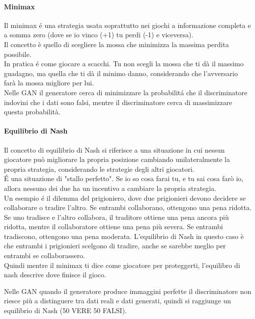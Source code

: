 \paragraph{Minimax}
Il minimax é una strategia usata soprattutto nei giochi a informazione completa e a somma zero (dove se io vinco (+1) tu perdi (-1) e viceversa).\\
Il concetto è quello di scegliere la mossa che minimizza la massima perdita possibile.\\
In pratica é come giocare a scacchi. Tu non scegli la mossa che ti dà il massimo guadagno, ma quella che ti dà il minimo danno, considerando che l'avversario farà la mossa migliore per lui.\\
Nelle GAN il generatore cerca di minimizzare la probabilitá che il discriminatore indovini che i dati sono falsi, mentre il discriminatore cerca di massimizzare questa probabilità.\\

\paragraph{Equilibrio di Nash}
Il concetto di equilibrio di Nash si riferisce a una situazione in cui nessun giocatore può migliorare la propria posizione cambiando unilateralmente la propria strategia, considerando le strategie degli altri giocatori.\\
É una situazione di "stallo perfetto". Se io so cosa farai tu, e tu sai cosa farò io, allora nessuno dei due ha un incentivo a cambiare la propria strategia.\\
Un esempio é il dilemma del prigioniero, dove due prigionieri devono decidere se collaborare o tradire l'altro. Se entrambi collaborano, ottengono una pena ridotta. Se uno tradisce e l'altro collabora, il traditore ottiene una pena ancora più ridotta, mentre il collaboratore ottiene una pena più severa. Se entrambi tradiscono, ottengono una pena moderata. L'equilibrio di Nash in questo caso è che entrambi i prigionieri scelgono di tradire, anche se sarebbe meglio per entrambi se collaborassero.\\

Quindi mentre il minimax ti dice come giocatore per proteggerti, l'equilibro di nash descrive dove finisce il gioco.

Nelle GAN quando il generatore produce immaggini perfette il discriminatore non riesce più a distinguere tra dati reali e dati generati, quindi si raggiunge un equilibrio di Nash (50 VERE 50 FALSI).\\

